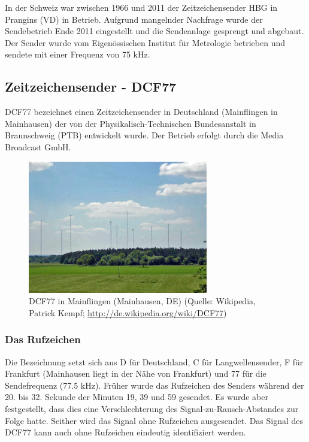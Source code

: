 In der Schweiz war zwischen 1966 und 2011 der Zeitzeichensender HBG in Prangins (VD) in Betrieb. Aufgrund mangelnder Nachfrage wurde der Sendebetrieb Ende 2011 eingestellt und die Sendeanlage gesprengt und abgebaut. Der Sender wurde vom Eigenössischen Institut für Metrologie betrieben und sendete mit einer Frequenz von 75 kHz.

\subsection{Zeitzeichensender - DCF77}
DCF77 bezeichnet einen Zeitzeichensender in Deutschland (Mainflingen in Mainhausen) der von der Physikalisch-Technischen Bundesanstalt in Braunschweig (PTB) entwickelt wurde. Der Betrieb erfolgt durch die Media Broadcast GmbH. 

\begin{figure}
  \begin{center}
    \includegraphics[width=0.7\textwidth]{./images/Analyse/DCF77_Mainflingen.jpg}
  \end{center}
  \caption[DCF77 in Mainflingen (Mainhausen, DE)]{DCF77 in Mainflingen (Mainhausen, DE) (Quelle: Wikipedia, Patrick Kempf; \url{http://de.wikipedia.org/wiki/DCF77})} 
\end{figure}

\subsubsection{Das Rufzeichen}
Die Bezeichnung setzt sich aus D für Deutschland, C für Langwellensender, F für Frankfurt (Mainhausen liegt in der Nähe von Frankfurt) und 77 für die Sendefrequenz (77.5 kHz). Früher wurde das Rufzeichen des Senders während der 20. bis 32. Sekunde der Minuten 19, 39 und 59 gesendet. Es wurde aber festgestellt, dass dies eine Verschlechterung des Signal-zu-Rausch-Abstandes zur Folge hatte. Seither wird das Signal ohne Rufzeichen ausgesendet. Das Signal des DCF77 kann auch ohne Rufzeichen eindeutig identifiziert werden.

